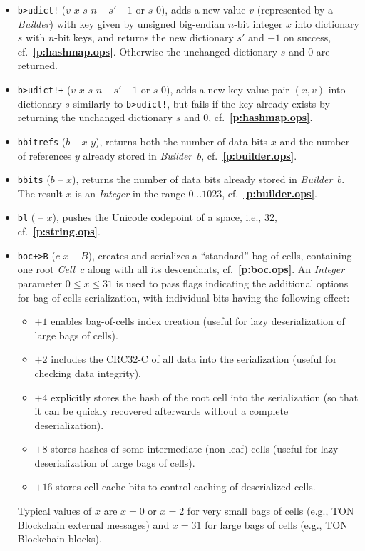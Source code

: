 \documentclass[12pt,oneside]{article}
\def\refpoint#1{{\rm\textbf{\ref{#1}}}}
\let\ptref=\refpoint
\begin{document}
\begin{itemize}
\item {\tt b>udict!} ($v$ $x$ $s$ $n$ -- $s'$ $-1$ or $s$ $0$), adds a new value $v$ (represented by a {\em Builder}) with key given by unsigned big-endian $n$-bit integer $x$ into dictionary $s$ with $n$-bit keys, and returns the new dictionary $s'$ and $-1$ on success, cf.~\ptref{p:hashmap.ops}. Otherwise the unchanged dictionary $s$ and $0$ are returned.
\item {\tt b>udict!+} ($v$ $x$ $s$ $n$ -- $s'$ $-1$ or $s$ $0$), adds a new key-value pair $(x,v)$ into dictionary $s$ similarly to {\tt b>udict!}, but fails if the key already exists by returning the unchanged dictionary $s$ and $0$, cf.~\ptref{p:hashmap.ops}.
\item {\tt bbitrefs} ($b$ -- $x$ $y$), returns both the number of data bits $x$ and the number of references $y$ already stored in {\em Builder\/}~$b$, cf.~\ptref{p:builder.ops}.
\item {\tt bbits} ($b$ -- $x$), returns the number of data bits already stored in {\em Builder\/}~$b$. The result $x$ is an {\em Integer\/} in the range $0\dots1023$, cf.~\ptref{p:builder.ops}.
\item {\tt bl} ( -- $x$), pushes the Unicode codepoint of a space, i.e., 32, cf.~\ptref{p:string.ops}.
\item {\tt boc+>B} ($c$ $x$ -- $B$), creates and serializes a ``standard'' bag of cells, containing one root {\em Cell\/}~$c$ along with all its descendants, cf.~\ptref{p:boc.ops}. An {\em Integer\/} parameter $0\leq x\leq 31$ is used to pass flags indicating the additional options for bag-of-cells serialization, with individual bits having the following effect:
  \begin{itemize}
  \item $+1$ enables bag-of-cells index creation (useful for lazy deserialization of large bags of cells).
  \item $+2$ includes the CRC32-C of all data into the serialization (useful for checking data integrity).
  \item $+4$ explicitly stores the hash of the root cell into the serialization (so that it can be quickly recovered afterwards without a complete deserialization).
  \item $+8$ stores hashes of some intermediate (non-leaf) cells (useful for lazy deserialization of large bags of cells).
  \item $+16$ stores cell cache bits to control caching of deserialized cells.
  \end{itemize}
Typical values of $x$ are $x=0$ or $x=2$ for very small bags of cells (e.g., TON Blockchain external messages) and $x=31$ for large bags of cells (e.g., TON Blockchain blocks).

\end{itemize}
\end{document}
